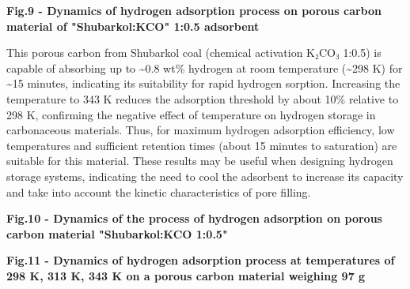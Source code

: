 

{\bfseries Fig.9 - Dynamics of hydrogen adsorption process on porous
carbon material of "Shubarkol:KCO"
1:0.5 adsorbent}

This porous carbon from Shubarkol coal (chemical activation K₂CO₃ 1:0.5)
is capable of absorbing up to \textasciitilde0.8 wt\% hydrogen at room
temperature (\textasciitilde298 K) for \textasciitilde15 minutes,
indicating its suitability for rapid hydrogen sorption. Increasing the
temperature to 343 K reduces the adsorption threshold by about 10\%
relative to 298 K, confirming the negative effect of temperature on
hydrogen storage in carbonaceous materials. Thus, for maximum hydrogen
adsorption efficiency, low temperatures and sufficient retention times
(about 15 minutes to saturation) are suitable for this material. These
results may be useful when designing hydrogen storage systems,
indicating the need to cool the adsorbent to increase its capacity and
take into account the kinetic characteristics of pore filling.


{\bfseries Fig.10 - Dynamics of the process of hydrogen adsorption on
porous carbon material "Shubarkol:KCO
1:0.5"}


{\bfseries Fig.11 - Dynamics of hydrogen adsorption process at
temperatures of 298 K, 313 K, 343 K on a porous carbon material weighing
97 g}


